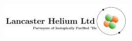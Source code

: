 \documentclass[
openany, %
parskip=full, %
12pt, %
a4paper, %
]{conferencebooklet} %
\begin{document}
	\begin{center}
		\includegraphics[width=0.5\textwidth]{images/logos/Partnerlogos/LancasterHelium.jpg}
	\end{center}
	
	\vfill
	
	
	\newpage
	
	\thispagestyle{empty} %
	\pagecolor{myblue} %
	~
	
	
\end{document}
